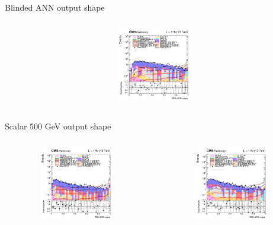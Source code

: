 \documentclass[8pt]{beamer}
\begin{document}
\begin{frame}{Blinded ANN output shape}
\begin{columns}
\begin{column}{0.33\textwidth}
\begin{center}
     			\includegraphics[width=1.0\textwidth, height=90pt]{figs/2018/log_cratio_topCR_ll_var_DNN_signal0_scalar100.png}
    		\end{center}		
		\end{column}
\end{columns}

\begin{columns}
\begin{column}{1.09\textwidth}
\begin{block}{\centering Scalar 500 GeV output shape}\end{block}
\end{column}
\end{columns} \vspace{-5pt}
\begin{columns}
		\begin{column}{0.33\textwidth}
			\begin{center}
     			\includegraphics[width=1.0\textwidth, height=90pt]{figs/2016/log_cratio_topCR_ll_var_DNN_signal0_scalar500.png}
    		\end{center}		
		\end{column}
		\begin{column}{0.33\textwidth}
			\begin{center}
     			\includegraphics[width=1.0\textwidth, height=90pt]{figs/2017/log_cratio_topCR_ll_var_DNN_signal0_scalar500.png}

\end{center}
\end{column}
\end{columns}
\end{frame}
\end{document}
